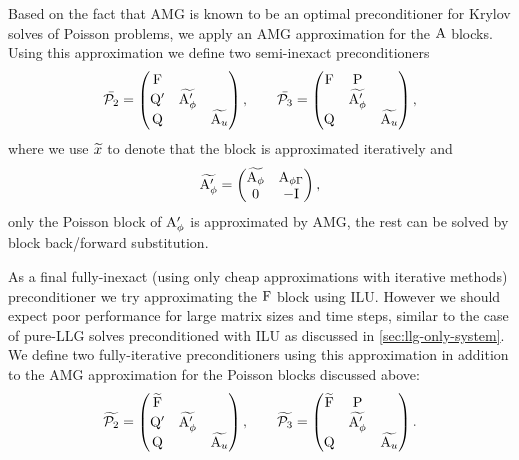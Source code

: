 Based on the fact that AMG is known to be an optimal preconditioner for Krylov solves of Poisson problems, we apply an AMG approximation for the $\mathrm{A}$ blocks.
Using this approximation we define two semi-inexact preconditioners
\begin{equation}
  \bar{\mathcal{P}_2} =
  \begin{pmatrix}
    \mathrm{F}       &           &  \\
    \mathrm{Q}'       & \widetilde{\mathrm{A}_\phi'} &   \\
    \mathrm{Q}       &           &   \widetilde{\mathrm{A}_u}
  \end{pmatrix},
  \qquad
  \bar{\mathcal{P}_3} =
  \begin{pmatrix}
    \mathrm{F}       & \mathrm{P}       &  \\
    & \widetilde{\mathrm{A}_\phi'} &   \\
    \mathrm{Q}       &           &  \widetilde{\mathrm{A}_u}
  \end{pmatrix},
  \label{eq:ms-block-prec-drop-p}
\end{equation}
where we use $\widetilde{x}$ to denote that the block is approximated iteratively and
\begin{equation}
  \widetilde{\mathrm{A}_\phi'} =
  \begin{pmatrix}
    \widetilde{\mathrm{A}_\phi}     & \mathrm{A}_{\phi{\Gamma}} \\
    0      & -\mathrm{I}
  \end{pmatrix},
\end{equation}
\ie only the Poisson block of $\mathrm{A}_\phi'$ is approximated by AMG, the rest can be solved by block back/forward substitution.

As a final fully-inexact (\ie using only cheap approximations with iterative methods) preconditioner we try approximating the $\mathrm{F}$ block using ILU.
However we should expect poor performance for large matrix sizes and time steps, similar to the case of pure-LLG solves preconditioned with ILU as discussed in \cref{sec:llg-only-system}.
We define two fully-iterative preconditioners using this approximation in addition to the AMG approximation for the Poisson blocks discussed above:
\begin{equation}
  \widetilde{\mathcal{P}_2} =
  \begin{pmatrix}
    \widetilde{\mathrm{F}} &           &  \\
    \mathrm{Q}'       & \widetilde{\mathrm{A}_\phi'} &   \\
    \mathrm{Q}       &           &   \widetilde{\mathrm{A}_u}
  \end{pmatrix},
  \qquad
  \widetilde{\mathcal{P}_3} =
  \begin{pmatrix}
   \widetilde{\mathrm{F}}       & \mathrm{P}       &  \\
    & \widetilde{\mathrm{A}_\phi'} &   \\
    \mathrm{Q}       &           &  \widetilde{\mathrm{A}_u}
  \end{pmatrix}.
  \label{eq:ms-block-prec-drop-p}
\end{equation}


